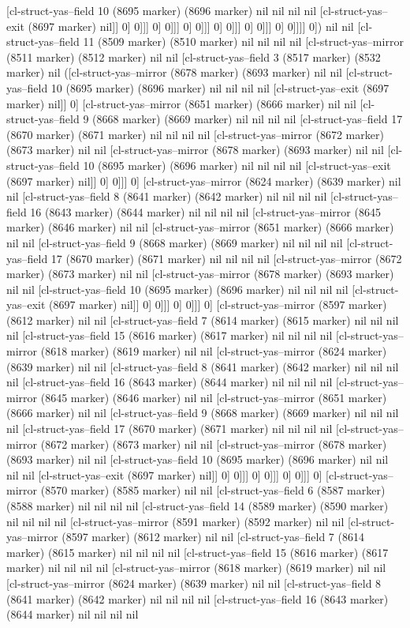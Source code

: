 {{[cl-struct-yas--field 10 (8695 marker) (8696 marker) nil nil nil nil [cl-struct-yas--exit (8697 marker) nil]] 0] 0]]] 0] 0]]] 0] 0]]] 0] 0]]] 0] 0]]] 0] 0]]]] 0]) nil nil [cl-struct-yas--field 11 (8509 marker) (8510 marker) nil nil nil nil [cl-struct-yas--mirror (8511 marker) (8512 marker) nil nil [cl-struct-yas--field 3 (8517 marker) (8532 marker) nil ([cl-struct-yas--mirror (8678 marker) (8693 marker) nil nil [cl-struct-yas--field 10 (8695 marker) (8696 marker) nil nil nil nil [cl-struct-yas--exit (8697 marker) nil]] 0] [cl-struct-yas--mirror (8651 marker) (8666 marker) nil nil [cl-struct-yas--field 9 (8668 marker) (8669 marker) nil nil nil nil [cl-struct-yas--field 17 (8670 marker) (8671 marker) nil nil nil nil [cl-struct-yas--mirror (8672 marker) (8673 marker) nil nil [cl-struct-yas--mirror (8678 marker) (8693 marker) nil nil [cl-struct-yas--field 10 (8695 marker) (8696 marker) nil nil nil nil [cl-struct-yas--exit (8697 marker) nil]] 0] 0]]] 0] [cl-struct-yas--mirror (8624 marker) (8639 marker) nil nil [cl-struct-yas--field 8 (8641 marker) (8642 marker) nil nil nil nil [cl-struct-yas--field 16 (8643 marker) (8644 marker) nil nil nil nil [cl-struct-yas--mirror (8645 marker) (8646 marker) nil nil [cl-struct-yas--mirror (8651 marker) (8666 marker) nil nil [cl-struct-yas--field 9 (8668 marker) (8669 marker) nil nil nil nil [cl-struct-yas--field 17 (8670 marker) (8671 marker) nil nil nil nil [cl-struct-yas--mirror (8672 marker) (8673 marker) nil nil [cl-struct-yas--mirror (8678 marker) (8693 marker) nil nil [cl-struct-yas--field 10 (8695 marker) (8696 marker) nil nil nil nil [cl-struct-yas--exit (8697 marker) nil]] 0] 0]]] 0] 0]]] 0] [cl-struct-yas--mirror (8597 marker) (8612 marker) nil nil [cl-struct-yas--field 7 (8614 marker) (8615 marker) nil nil nil nil [cl-struct-yas--field 15 (8616 marker) (8617 marker) nil nil nil nil [cl-struct-yas--mirror (8618 marker) (8619 marker) nil nil [cl-struct-yas--mirror (8624 marker) (8639 marker) nil nil [cl-struct-yas--field 8 (8641 marker) (8642 marker) nil nil nil nil [cl-struct-yas--field 16 (8643 marker) (8644 marker) nil nil nil nil [cl-struct-yas--mirror (8645 marker) (8646 marker) nil nil [cl-struct-yas--mirror (8651 marker) (8666 marker) nil nil [cl-struct-yas--field 9 (8668 marker) (8669 marker) nil nil nil nil [cl-struct-yas--field 17 (8670 marker) (8671 marker) nil nil nil nil [cl-struct-yas--mirror (8672 marker) (8673 marker) nil nil [cl-struct-yas--mirror (8678 marker) (8693 marker) nil nil [cl-struct-yas--field 10 (8695 marker) (8696 marker) nil nil nil nil [cl-struct-yas--exit (8697 marker) nil]] 0] 0]]] 0] 0]]] 0] 0]]] 0] [cl-struct-yas--mirror (8570 marker) (8585 marker) nil nil [cl-struct-yas--field 6 (8587 marker) (8588 marker) nil nil nil nil [cl-struct-yas--field 14 (8589 marker) (8590 marker) nil nil nil nil [cl-struct-yas--mirror (8591 marker) (8592 marker) nil nil [cl-struct-yas--mirror (8597 marker) (8612 marker) nil nil [cl-struct-yas--field 7 (8614 marker) (8615 marker) nil nil nil nil [cl-struct-yas--field 15 (8616 marker) (8617 marker) nil nil nil nil [cl-struct-yas--mirror (8618 marker) (8619 marker) nil nil [cl-struct-yas--mirror (8624 marker) (8639 marker) nil nil [cl-struct-yas--field 8 (8641 marker) (8642 marker) nil nil nil nil [cl-struct-yas--field 16 (8643 marker) (8644 marker) nil nil nil nil }}
